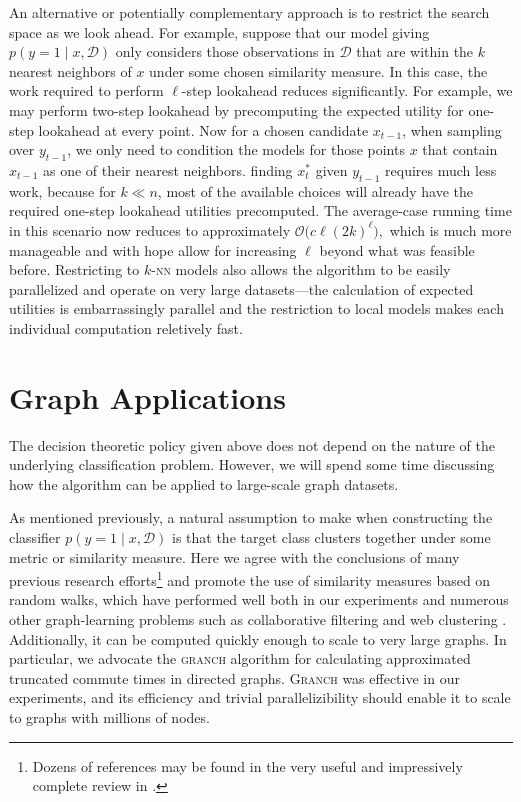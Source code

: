 \documentclass{acm_proc_article-sp}
\newcommand{\cm}[1]{\mathcal{#1}}
\newcommand{\data}{\cm{D}}
\newcommand{\given}{\mid}
\begin{document}
An alternative or potentially complementary approach is to restrict
the search space as we look ahead.  For example, suppose that our
model giving $p(y = 1\given x, \data)$ only considers those
observations in $\data$ that are within the $k$ nearest neighbors of
$x$ under some chosen similarity measure.  In this case, the work
required to perform $\ell$-step lookahead reduces significantly.  For
example, we may perform two-step lookahead by precomputing the
expected utility for one-step lookahead at every point.  Now for a
chosen candidate $x_{t-1}$, when sampling over $y_{t-1}$, we only need
to condition the models for those points $x$ that contain $x_{t-1}$ as
one of their nearest neighbors.  finding $x_t^\ast$ given $y_{t-1}$
requires much less work, because for $k \ll n$, most of the available
choices will already have the required one-step lookahead utilities
precomputed.  The average-case running time in this scenario now
reduces to approximately $\cm{O}\bigl(c\ell(2k)^\ell\bigr),$ which is
much more manageable and with hope allow for increasing $\ell$ beyond
what was feasible before.  Restricting to $k$-\textsc{nn} models also
allows the algorithm to be easily parallelized and operate on very
large datasets---the calculation of expected utilities is
embarrassingly parallel and the restriction to local models makes each
individual computation reletively fast.

\section{Graph Applications}
\label{graphs}

The decision theoretic policy given above does not depend on the
nature of the underlying classification problem.  However, we will
spend some time discussing how the algorithm can be applied to
large-scale graph datasets.

As mentioned previously, a natural assumption to make when
constructing the classifier $p(y = 1 \given x, \data)$ is that the
target class clusters together under some metric or similarity
measure.  Here we agree with the conclusions of many previous research
efforts\footnote{Dozens of references may be found in the very useful
  and impressively complete review in \citep{fousssigmoid}.} and
promote the use of similarity measures based on random walks, which
have performed well both in our experiments and numerous other
graph-learning problems such as collaborative filtering and web
clustering \citep{fousssigmoid}.  Additionally, it can be computed
quickly enough to scale to very large graphs.  In particular, we
advocate the \textsc{granch} algorithm \citep{granch, granchfast} for
calculating approximated truncated commute times in directed graphs.
\textsc{Granch} was effective in our experiments, and its efficiency
and trivial parallelizibility should enable it to scale to graphs with
millions of nodes.
\end{document}
